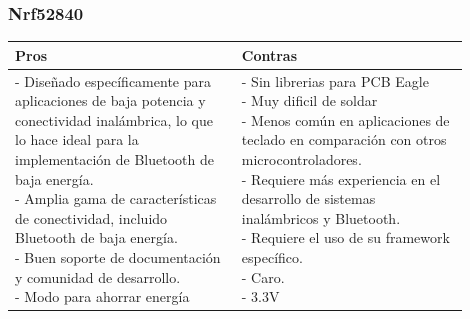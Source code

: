 \subsubsection{Nrf52840}
\begin{table}[H]
\centering
\small
\begin{tabular}{|p{0.45\linewidth}|p{0.45\linewidth}|}
\hline
\textbf{Pros} &
\textbf{Contras} \\
\hline
\parbox[t]{\linewidth}{
\vspace{0.1cm}
- Diseñado específicamente para aplicaciones de baja potencia y conectividad inalámbrica, lo que lo hace ideal para la implementación de \gls{Bluetooth} de baja energía. \bigskip \\
- Amplia gama de características de conectividad, incluido \gls{Bluetooth} de baja energía. \bigskip \\
- Buen soporte de documentación y comunidad de desarrollo. \bigskip \\
- Modo  para ahorrar energía
} &
\parbox[t]{\linewidth}{
\vspace{0.1cm}
- Sin librerias para \gls{PCB} Eagle \bigskip \\
- Muy dificil de soldar \bigskip \\
- Menos común en aplicaciones de teclado en comparación con otros microcontroladores. \bigskip \\
- Requiere más experiencia en el desarrollo de sistemas inalámbricos y \gls{Bluetooth}. \bigskip \\
- Requiere el uso de su framework específico. \bigskip \\
- Caro. \bigskip \\
- 3.3V} \bigskip \\
\hline
\end{tabular}
\end{table}


